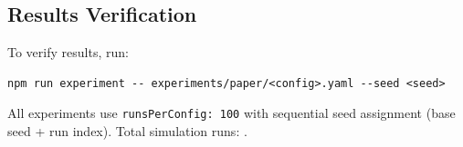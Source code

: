 \subsection{Results Verification}

To verify results, run:
\begin{verbatim}
npm run experiment -- experiments/paper/<config>.yaml --seed <seed>
\end{verbatim}

All experiments use \texttt{runsPerConfig: 100} with sequential seed assignment (base seed + run index). Total simulation runs: \totalruns{}.
